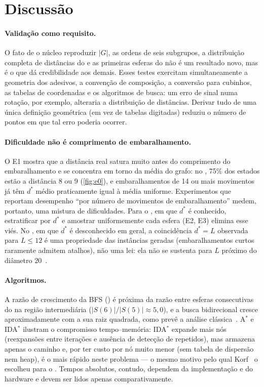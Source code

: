 \section{Discussão}\label{sec:discussao}

\paragraph{Validação como requisito.} O fato de o núcleo reproduzir $|G|$, as ordens de seis subgrupos, a distribuição completa de distâncias do  e as primeiras esferas do  não é um resultado novo, mas é o que dá credibilidade aos demais. Esses testes exercitam simultaneamente a geometria dos adesivos, a convenção de composição, a conversão para cubinhos, as tabelas de coordenadas e os algoritmos de busca: um erro de sinal numa rotação, por exemplo, alteraria a distribuição de distâncias. Derivar tudo de uma única definição geométrica (em vez de tabelas digitadas) reduziu o número de pontos em que tal erro poderia ocorrer.

\paragraph{Dificuldade não é comprimento de embaralhamento.} O E1 mostra que a distância real satura muito antes do comprimento do embaralhamento e se concentra em torno da média do grafo: no , 75\% dos estados estão a distância 8 ou 9 (\cref{fig:e0}), e embaralhamentos de 14 ou mais movimentos já têm $d^*$ médio praticamente igual à média uniforme. Experimentos que reportam desempenho ``por número de movimentos de embaralhamento'' medem, portanto, uma mistura de dificuldades. Para o , em que $d^*$ é conhecido, estratificar por $d^*$ e amostrar uniformemente cada esfera (E2, E3) elimina esse viés. No , em que $d^*$ é desconhecido em geral, a coincidência $d^*=L$ observada para $L\le12$ é uma propriedade das instâncias geradas (embaralhamentos curtos raramente admitem atalhos), não uma lei: ela não se sustenta para $L$ próximo do diâmetro 20~\cite{rokicki2014}.

\paragraph{Algoritmos.} A razão de crescimento da BFS (\gclEoneGrowthBFS) é próxima da razão entre esferas consecutivas do  na região intermediária ($|S(6)|/|S(5)|\approx5{,}0$), e a busca bidirecional cresce aproximadamente com a sua raiz quadrada, como prevê a análise clássica~\cite{pohl1971,russell2021}. A$^*$ e IDA$^*$ ilustram o compromisso tempo--memória: IDA$^*$ expande mais nós (reexpansões entre iterações e ausência de detecção de repetidos), mas armazena apenas o caminho e, por ter custo por nó muito menor (sem tabela de dispersão nem heap), é o mais rápido neste problema --- o mesmo motivo pelo qual Korf~\cite{korf1997} o escolheu para o . Tempos absolutos, contudo, dependem da implementação e do hardware e devem ser lidos apenas comparativamente.

